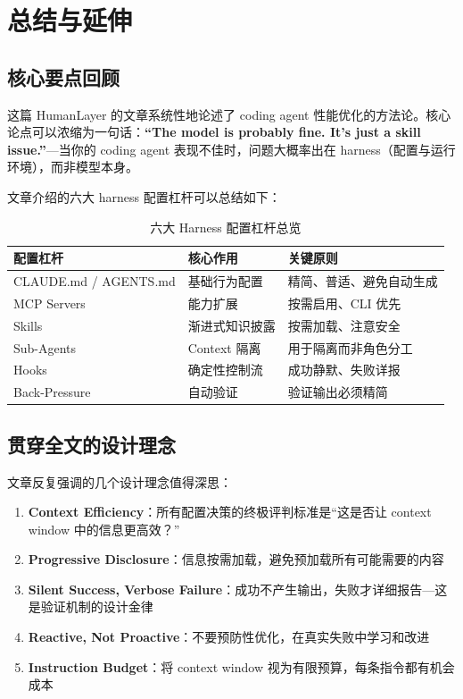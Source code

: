 \section{总结与延伸}

\subsection{核心要点回顾}

这篇 HumanLayer 的文章系统性地论述了 coding agent 性能优化的方法论。核心论点可以浓缩为一句话：\textbf{``The model is probably fine. It's just a skill issue.''}---当你的 coding agent 表现不佳时，问题大概率出在 harness（配置与运行环境），而非模型本身。

文章介绍的六大 harness 配置杠杆可以总结如下：

\begin{table}[H]
\centering
\caption{六大 Harness 配置杠杆总览}
\begin{tabular}{@{}p{3.5cm}p{4cm}p{5.5cm}@{}}
\toprule
\textbf{配置杠杆} & \textbf{核心作用} & \textbf{关键原则} \\
\midrule
CLAUDE.md / AGENTS.md & 基础行为配置 & 精简、普适、避免自动生成 \\
MCP Servers & 能力扩展 & 按需启用、CLI 优先 \\
Skills & 渐进式知识披露 & 按需加载、注意安全 \\
Sub-Agents & Context 隔离 & 用于隔离而非角色分工 \\
Hooks & 确定性控制流 & 成功静默、失败详报 \\
Back-Pressure & 自动验证 & 验证输出必须精简 \\
\bottomrule
\end{tabular}
\end{table}

\subsection{贯穿全文的设计理念}

文章反复强调的几个设计理念值得深思：

\begin{enumerate}[leftmargin=1.5em]
    \item \textbf{Context Efficiency}：所有配置决策的终极评判标准是``这是否让 context window 中的信息更高效？''
    \item \textbf{Progressive Disclosure}：信息按需加载，避免预加载所有可能需要的内容
    \item \textbf{Silent Success, Verbose Failure}：成功不产生输出，失败才详细报告---这是验证机制的设计金律
    \item \textbf{Reactive, Not Proactive}：不要预防性优化，在真实失败中学习和改进
    \item \textbf{Instruction Budget}：将 context window 视为有限预算，每条指令都有机会成本
\end{enumerate}

